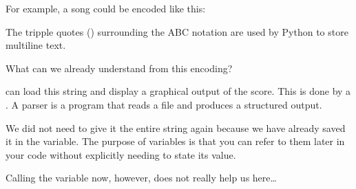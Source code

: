 \documentclass[letterpaper,10pt,english]{sphinxmanual}
\begin{document}
For example, a song could be encoded like this:

{
\begin{sphinxVerbatim}[commandchars=\\\{\}]
\llap{\color{nbsphinxin}[6]:\,\hspace{\fboxrule}\hspace{\fboxsep}}  
\end{sphinxVerbatim}
}

The tripple quotes () surrounding the ABC notation are used by Python to store multi\sphinxhyphen{}line text.

What can we already understand from this encoding?

 can load this string and display a graphical output of the score. This is done by a . A parser is a program that reads a file and produces a structured output.

{
\begin{sphinxVerbatim}[commandchars=\\\{\}]
\llap{\color{nbsphinxin}[7]:\,\hspace{\fboxrule}\hspace{\fboxsep}}  
\end{sphinxVerbatim}
}

We did not need to give it the entire string again because we have already saved it in the  variable. The purpose of variables is that you can refer to them later in your code without explicitly needing to state its value.

Calling the variable  now, however, does not really help us here…
\end{document}
